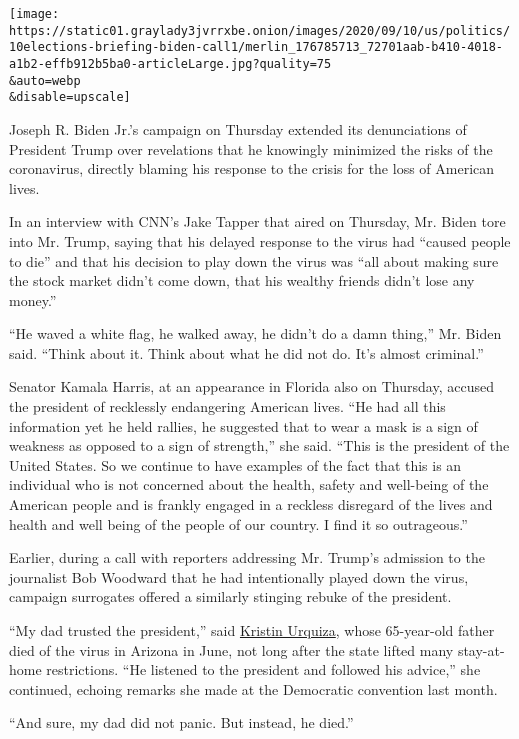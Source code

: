 \texttt{[image: https://static01.graylady3jvrrxbe.onion/images/2020/09/10/us/politics/10elections-briefing-biden-call1/merlin\_176785713\_72701aab-b410-4018-a1b2-effb912b5ba0-articleLarge.jpg?quality=75\\\&auto=webp\\\&disable=upscale]}

Joseph R. Biden Jr.'s campaign on Thursday extended its denunciations of
President Trump over revelations that he knowingly minimized the risks
of the coronavirus, directly blaming his response to the crisis for the
loss of American lives.

In an interview with CNN's Jake Tapper that aired on Thursday, Mr. Biden
tore into Mr. Trump, saying that his delayed response to the virus had
``caused people to die'' and that his decision to play down the virus
was ``all about making sure the stock market didn't come down, that his
wealthy friends didn't lose any money.''

``He waved a white flag, he walked away, he didn't do a damn thing,''
Mr. Biden said. ``Think about it. Think about what he did not do. It's
almost criminal.''

Senator Kamala Harris, at an appearance in Florida also on Thursday,
accused the president of recklessly endangering American lives. ``He had
all this information yet he held rallies, he suggested that to wear a
mask is a sign of weakness as opposed to a sign of strength,'' she said.
``This is the president of the United States. So we continue to have
examples of the fact that this is an individual who is not concerned
about the health, safety and well-being of the American people and is
frankly engaged in a reckless disregard of the lives and health and well
being of the people of our country. I find it so outrageous.''

Earlier, during a call with reporters addressing Mr. Trump's admission
to the journalist Bob Woodward that he had intentionally played down the
virus, campaign surrogates offered a similarly stinging rebuke of the
president.

``My dad trusted the president,'' said
\href{https://www.nytimes3xbfgragh.onion/2020/08/18/us/elections/kristin-urquiza-whose-father-died-of-covid-19-turned-grief-into-activism-at-the-convention.html}{Kristin
Urquiza}, whose 65-year-old father died of the virus in Arizona in June,
not long after the state lifted many stay-at-home restrictions. ``He
listened to the president and followed his advice,'' she continued,
echoing remarks she made at the Democratic convention last month.

``And sure, my dad did not panic. But instead, he died.''

